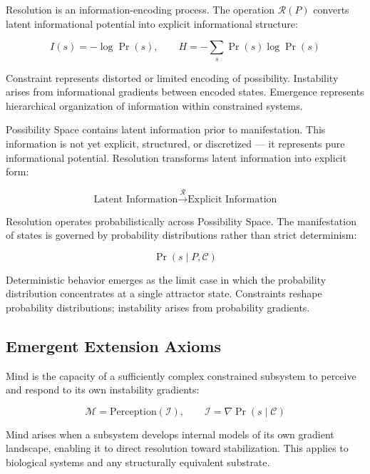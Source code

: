 \documentclass[12pt, a4paper]{article}
\begin{document}
\begin{formalbox}[title={Axiom 5: Information Encoding}]
Resolution is an information-encoding process. The operation $\mathcal{R}(P)$ converts
latent informational potential into explicit informational structure:

\[
  I(s) = -\log \Pr(s), \qquad H = -\sum_s \Pr(s)\log \Pr(s)
\]

Constraint represents distorted or limited encoding of possibility. Instability arises
from informational gradients between encoded states. Emergence represents hierarchical
organization of information within constrained systems.
\end{formalbox}

\begin{formalbox}[title={Axiom 6: Latent Information}]
Possibility Space contains latent information prior to manifestation. This information
is not yet explicit, structured, or discretized --- it represents pure informational
potential. Resolution transforms latent information into explicit form:

\[
  \text{Latent Information} \xrightarrow{\mathcal{R}} \text{Explicit Information}
\]
\end{formalbox}

\begin{formalbox}[title={Axiom 7: Probabilistic Resolution}]
Resolution operates probabilistically across Possibility Space. The manifestation of
states is governed by probability distributions rather than strict determinism:

\[
  \Pr(s \mid P, \mathcal{C})
\]

Deterministic behavior emerges as the limit case in which the probability distribution
concentrates at a single attractor state. Constraints reshape probability distributions;
instability arises from probability gradients.
\end{formalbox}

\subsection{Emergent Extension Axioms}

\begin{formalbox}[title={Axiom 8: Mind as Instability Perception ($\mathcal{M}$)}]
Mind is the capacity of a sufficiently complex constrained subsystem to perceive and
respond to its own instability gradients:

\[
  \mathcal{M} = \mathrm{Perception}(\mathcal{I}), \qquad
  \mathcal{I} = \nabla \Pr(s \mid \mathcal{C})
\]

Mind arises when a subsystem develops internal models of its own gradient landscape,
enabling it to direct resolution toward stabilization. This applies to biological
systems and any structurally equivalent substrate.
\end{formalbox}
\end{document}

